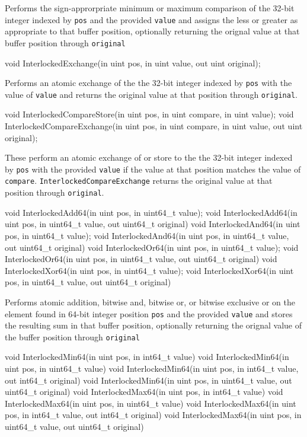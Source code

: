 Performs the sign-approrpriate minimum or maximum comparison of the 32-bit integer indexed by \texttt{pos}
and the provided \texttt{value} and assigns the less or greater as appropriate to that buffer position,
optionally returning the orignal value at that buffer position through \texttt{original}

\begin{HLSL}
   void InterlockedExchange(in uint pos, in uint value, out uint original);
\end{HLSL}

Performs an atomic exchange of the the 32-bit integer indexed by \texttt{pos} with
the value of \texttt{value} and returns the original value at that position through \texttt{original}.

\begin{HLSL}
   void InterlockedCompareStore(in uint pos, in uint compare, in uint value);
   void InterlockedCompareExchange(in uint pos, in uint compare, in uint value,
                                    out uint original);
\end{HLSL}

These perform an atomic exchange of or store to the the 32-bit integer indexed by \texttt{pos}
with the provided \texttt{value} if the value at that position matches the value of \texttt{compare}.
\texttt{InterlockedCompareExchange} returns the original value at that position through \texttt{original}.

\begin{HLSL}
   void InterlockedAdd64(in uint pos, in uint64_t value);
   void InterlockedAdd64(in uint pos, in uint64_t value, out uint64_t original)
   void InterlockedAnd64(in uint pos, in uint64_t value);
   void InterlockedAnd64(in uint pos, in uint64_t value, out uint64_t original)
   void InterlockedOr64(in uint pos, in uint64_t value);
   void InterlockedOr64(in uint pos, in uint64_t value, out uint64_t original)
   void InterlockedXor64(in uint pos, in uint64_t value);
   void InterlockedXor64(in uint pos, in uint64_t value, out uint64_t original)
\end{HLSL}

Performs atomic addition, bitwise and, bitwise or, or bitwise exclusive or
on the element found in 64-bit integer position \texttt{pos} and the provided \texttt{value}
and stores the resulting sum in that buffer position,
optionally returning the orignal value of the buffer position through \texttt{original}

\begin{HLSL}
   void InterlockedMin64(in uint pos, in int64_t value)
   void InterlockedMin64(in uint pos, in uint64_t value)
   void InterlockedMin64(in uint pos, in int64_t value, out int64_t original)
   void InterlockedMin64(in uint pos, in uint64_t value, out uint64_t original)
   void InterlockedMax64(in uint pos, in int64_t value)
   void InterlockedMax64(in uint pos, in uint64_t value)
   void InterlockedMax64(in uint pos, in int64_t value, out int64_t original)
   void InterlockedMax64(in uint pos, in uint64_t value, out uint64_t original)
\end{HLSL}


